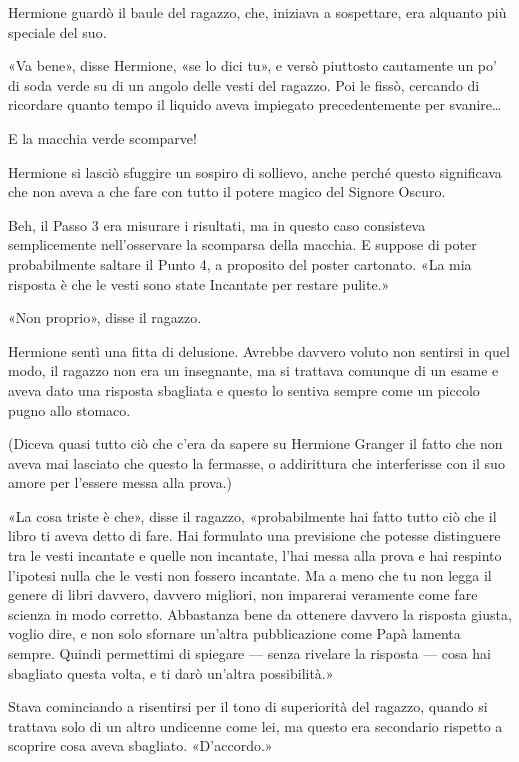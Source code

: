 Hermione guardò il baule del ragazzo, che, iniziava a sospettare, era alquanto più speciale del suo.

«Va bene», disse Hermione, «se lo dici tu», e versò piuttosto cautamente un po’ di soda verde su di un angolo delle vesti del ragazzo. Poi le fissò, cercando di ricordare quanto tempo il liquido aveva impiegato precedentemente per svanire…

E la macchia verde scomparve!

Hermione si lasciò sfuggire un sospiro di sollievo, anche perché questo significava che non aveva a che fare con tutto il potere magico del Signore Oscuro.

Beh, il Passo 3 era misurare i risultati, ma in questo caso consisteva semplicemente nell’osservare la scomparsa della macchia. E suppose di poter probabilmente saltare il Punto 4, a proposito del poster cartonato. «La mia risposta è che le vesti sono state Incantate per restare pulite.»

«Non proprio», disse il ragazzo.

Hermione sentì una fitta di delusione. Avrebbe davvero voluto non sentirsi in quel modo, il ragazzo non era un insegnante, ma si trattava comunque di un esame e aveva dato una risposta sbagliata e questo lo sentiva sempre come un piccolo pugno allo stomaco.

(Diceva quasi tutto ciò che c’era da sapere su Hermione Granger il fatto che non aveva mai lasciato che questo la fermasse, o addirittura che interferisse con il suo amore per l’essere messa alla prova.)

«La cosa triste è che», disse il ragazzo, «probabilmente hai fatto tutto ciò che il libro ti aveva detto di fare. Hai formulato una previsione che potesse distinguere tra le vesti incantate e quelle non incantate, l’hai messa alla prova e hai respinto l’ipotesi nulla che le vesti non fossero incantate. Ma a meno che tu non legga il genere di libri davvero, davvero migliori, non imparerai veramente come fare scienza in modo corretto. Abbastanza bene da ottenere davvero la risposta giusta, voglio dire, e non solo sfornare un’altra pubblicazione come Papà lamenta sempre. Quindi permettimi di spiegare — senza rivelare la risposta — cosa hai sbagliato questa volta, e ti darò un’altra possibilità.»

Stava cominciando a risentirsi per il tono di superiorità del ragazzo, quando si trattava solo di un altro undicenne come lei, ma questo era secondario rispetto a scoprire cosa aveva sbagliato. «D’accordo.»


